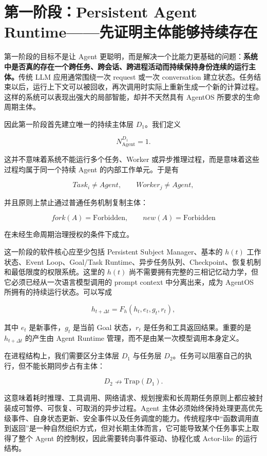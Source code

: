 \section{第一阶段：Persistent Agent Runtime——先证明主体能够持续存在}

第一阶段的目标不是让 Agent 更聪明，而是解决一个比能力更基础的问题：\textbf{系统中是否真的存在一个跨任务、跨会话、跨进程活动而持续保持身份连续的运行主体。}传统 LLM 应用通常围绕一次 request 或一次 conversation 建立状态。任务结束以后，运行上下文可以被回收，再次调用时实际上重新生成一个新的计算过程。这样的系统可以表现出强大的局部智能，却并不天然具有 AgentOS 所要求的生命周期主体。

因此第一阶段首先建立唯一的持续主体层 \(D_1\)。我们定义

\[
N_{\mathrm{Agent}}^{D_1}=1.
\]

这并不意味着系统不能运行多个任务、Worker 或异步推理过程，而是意味着这些过程均属于同一个持续 Agent 的内部工作单元。于是有

\[
Task_i\neq Agent,
\qquad
Worker_j\neq Agent,
\]

并且原则上禁止通过普通任务机制复制主体：

\[
fork(A)=\mathrm{Forbidden},
\qquad
new(A)=\mathrm{Forbidden}
\]

在未经生命周期治理授权的条件下成立。

这一阶段的软件核心应至少包括 Persistent Subject Manager、基本的 \(h(t)\) 工作状态、Event Loop、Goal/Task Runtime、异步任务队列、Checkpoint、恢复机制和最低限度的权限系统。这里的 \(h(t)\) 尚不需要拥有完整的三相记忆动力学，但它必须已经从一次语言模型调用的 prompt context 中分离出来，成为 AgentOS 所拥有的持续运行状态。可以写成

\[
h_{t+\Delta t}
=
F_h
\left(
h_t,
e_t,
g_t,
r_t
\right),
\]

其中 \(e_t\) 是新事件，\(g_t\) 是当前 Goal 状态，\(r_t\) 是任务和工具返回结果。重要的是 \(h_{t+\Delta t}\) 的产生由 Agent Runtime 管理，而不是由某一次模型调用本身定义。

在进程结构上，我们需要区分主体层 \(D_1\) 与任务层 \(D_2\)。任务可以阻塞自己的执行，但不能长期同步占有主体：

\[
D_2
\nrightarrow
\mathrm{Trap}(D_1).
\]

这意味着耗时推理、工具调用、网络请求、规划搜索和长周期任务原则上都应被封装成可暂停、可恢复、可取消的异步过程。Agent 主体必须始终保持处理更高优先级事件、自身状态更新、安全事件以及任务调度的能力。传统程序中“函数调用直到返回”是一种自然组织方式，但对长期主体而言，它可能导致某个任务事实上取得了整个 Agent 的控制权，因此需要转向事件驱动、协程化或 Actor-like 的运行结构。

